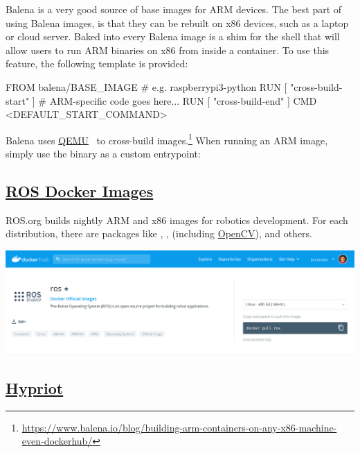 Balena is a very good source of base images for ARM devices. The best part of using Balena images, is that they can be rebuilt on x86 devices, such as a laptop or cloud server. Baked into every Balena image is a shim for the shell that will allow users to run ARM binaries on x86 from inside a container. To use this feature, the following  template is provided:
%
\begin{dockerlisting}
FROM balena/BASE_IMAGE # e.g. raspberrypi3-python
RUN [ "cross-build-start" ]
# ARM-specific code goes here...
RUN [ "cross-build-end" ]
CMD <DEFAULT_START_COMMAND>
\end{dockerlisting}
%
Balena uses \href{https://www.qemu.org/}{QEMU}~\citep{bellard2005qemu} to cross-build images.\hspace{-.08em}\footnote{\url{https://www.balena.io/blog/building-arm-containers-on-any-x86-machine-even-dockerhub/}} When running an ARM image, simply use the  binary as a custom entrypoint:
%

\subsection{\href{https://hub.docker.com/_/ros}{ROS Docker Images}}

ROS.org builds nightly ARM and x86 images for robotics development. For each distribution, there are packages like , ,  (including \href{https://opencv.org/}{OpenCV}),  and others.\vspace{10pt}
%
\begin{centering}
\includegraphics[width=\textwidth]{../figures/ros_docker_images.png}
\end{centering}

\subsection{\href{https://blog.hypriot.com/}{Hypriot}}\label{subsec:hypriot}

